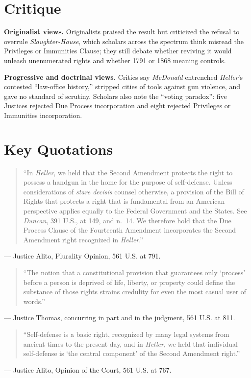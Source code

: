 \documentclass[12pt]{article}
\begin{document}
\section{Critique}

\textbf{Originalist views.} Originalists praised the result but criticized the refusal to overrule \textit{Slaughter-House}, which scholars across the spectrum think misread the Privileges or Immunities Clause; they still debate whether reviving it would unleash unenumerated rights and whether 1791 or 1868 meaning controls.

\textbf{Progressive and doctrinal views.} Critics say \textit{McDonald} entrenched \textit{Heller}'s contested ``law-office history,'' stripped cities of tools against gun violence, and gave no standard of scrutiny. Scholars also note the ``voting paradox'': five Justices rejected Due Process incorporation and eight rejected Privileges or Immunities incorporation.

\section{Key Quotations}

\begin{quote}
``In \textit{Heller}, we held that the Second Amendment protects the right to possess a handgun in the home for the purpose of self-defense. Unless considerations of \textit{stare decisis} counsel otherwise, a provision of the Bill of Rights that protects a right that is fundamental from an American perspective applies equally to the Federal Government and the States. See \textit{Duncan}, 391 U.S., at 149, and n.~14. We therefore hold that the Due Process Clause of the Fourteenth Amendment incorporates the Second Amendment right recognized in \textit{Heller}.''
\end{quote}
\noindent --- Justice Alito, Plurality Opinion, 561 U.S. at 791.

\begin{quote}
``The notion that a constitutional provision that guarantees only `process' before a person is deprived of life, liberty, or property could define the substance of those rights strains credulity for even the most casual user of words.''
\end{quote}
\noindent --- Justice Thomas, concurring in part and in the judgment, 561 U.S. at 811.

\begin{quote}
``Self-defense is a basic right, recognized by many legal systems from ancient times to the present day, and in \textit{Heller}, we held that individual self-defense is `the central component' of the Second Amendment right.''
\end{quote}
\noindent --- Justice Alito, Opinion of the Court, 561 U.S. at 767.
\end{document}
